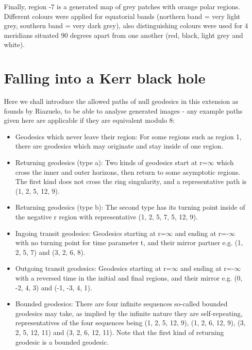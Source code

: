 \documentclass[oneside,openright,frontopenright, singlespacing]{dmathesis}
\begin{document}
\vspace{1em}
	Finally, region -7 is a generated map of grey patches with orange polar regions. Different colours were applied for equatorial bands (northern band = very light grey, southern band = very dark grey), also distinguishing colours were used for 4 meridians situated 90 degrees apart from one another (red, black, light grey and white).

\section{Falling into a Kerr black hole}\label{sec:Section6.2}

\vspace{1em}
	Here we shall introduce the allowed paths of null geodesics in this extension as founds by Riazuelo, to be able to analyse generated images - any example paths given here are applicable if they are equivalent modulo 8:

\vspace{1em}
\begin{itemize}
  \item Geodesics which never leave their region: For some regions such as region 1, there are geodesics which may originate and stay inside of one region.
  \item Returning geodesics (type a): Two kinds of geodesics start at r=$\infty$ which cross the inner and outer horizons, then return to some asymptotic regions. The first kind does not cross the ring singularity, and a representative path is (1, 2, 5, 12, 9).
  \item Returning geodesics (type b): The second type has its turning point inside of the negative r region with representative (1, 2, 5, 7, 5, 12, 9).
  \item Ingoing transit geodesics: Geodesics starting at r=$\infty$ and ending at r=-$\infty$ with no turning point for time parameter t, and their mirror partner e.g. (1, 2, 5, 7) and (3, 2, 6, 8).
  \item Outgoing transit geodesics: Geodesics starting at r=$\infty$ and ending at r=-$\infty$ with a reversed time in the initial and final regions, and their mirror e.g. (0, -2, 4, 3) and (-1, -3, 4, 1).
  \item Bounded geodesics: There are four infinite sequences so-called bounded geodesics may take, as implied by the infinite nature they are self-repeating, representatives of the four sequences being (1, 2, 5, 12, 9), (1, 2, 6, 12, 9), (3, 2, 5, 12, 11) and (3, 2, 6, 12, 11). Note that the first kind of returning geodesic is a bounded geodesic.
\end{itemize}
\end{document}
